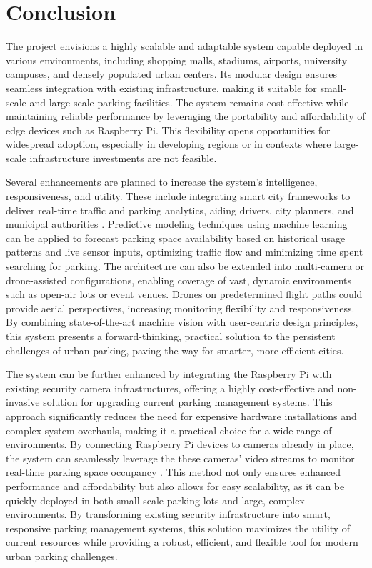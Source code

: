 \documentclass[conference]{IEEEtran}
\begin{document}
\section{Conclusion}

The project envisions a highly scalable and adaptable system capable deployed in various environments, 
including shopping malls, 
stadiums, 
airports, 
university campuses, 
and densely populated urban centers. 
Its modular design ensures seamless integration with existing infrastructure, 
making it suitable for small-scale and large-scale parking facilities. 
The system remains cost-effective while maintaining reliable performance by leveraging the portability and affordability of edge devices such as Raspberry Pi.
This flexibility opens opportunities for widespread adoption, 
especially in developing regions or in contexts where large-scale infrastructure investments are not feasible.

Several enhancements are planned to increase the system's intelligence, 
responsiveness, 
and utility. 
These include integrating smart city frameworks to deliver real-time traffic and parking analytics, 
aiding drivers, city planners, and municipal authorities \cite{smart_cities}. 
Predictive modeling techniques using machine learning can be applied to forecast parking space availability based on historical usage patterns and live sensor inputs, 
optimizing traffic flow and minimizing time spent searching for parking. 
The architecture can also be extended into multi-camera or drone-assisted configurations, 
enabling coverage of vast, dynamic environments such as open-air lots or event venues. 
Drones on predetermined flight paths could provide aerial perspectives, 
increasing monitoring flexibility and responsiveness. 
By combining state-of-the-art machine vision with user-centric design principles, 
this system presents a forward-thinking, 
practical solution to the persistent challenges of urban parking, 
paving the way for smarter, more efficient cities.

The system can be further enhanced by integrating the Raspberry Pi with existing security camera infrastructures, 
offering a highly cost-effective and non-invasive solution for upgrading current parking management systems. 
This approach significantly reduces the need for expensive hardware installations and complex system overhauls, 
making it a practical choice for a wide range of environments. 
By connecting Raspberry Pi devices to cameras already in place, 
the system can seamlessly leverage the these cameras' video streams to monitor real-time parking space occupancy \cite{parking_space_management}. 
This method not only ensures enhanced performance and affordability but also allows for easy scalability, 
as it can be quickly deployed in both small-scale parking lots and large, 
complex environments. 
By transforming existing security infrastructure into smart, 
responsive parking management systems, 
this solution maximizes the utility of current resources while providing a robust, 
efficient, 
and flexible tool for modern urban parking challenges.
\end{document}
